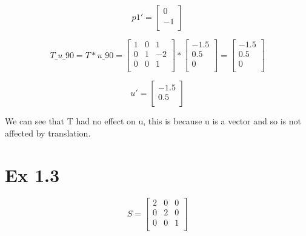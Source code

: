 \documentclass{article}
\begin{document}
\[
    p1' =
    \begin{bmatrix}
        0  \\
        -1 \\
    \end{bmatrix}
\]



\[
    T\_u\_90 = T * u\_90 =
    \begin{bmatrix}
        1 & 0 & 1  \\
        0 & 1 & -2 \\
        0 & 0 & 1  \\
    \end{bmatrix}
    *
    \begin{bmatrix}
        -1.5 \\
        0.5  \\
        0    \\
    \end{bmatrix}
    =
    \begin{bmatrix}
        -1.5 \\
        0.5  \\
        0    \\
    \end{bmatrix}
\]


\[
    u' =
    \begin{bmatrix}
        -1.5 \\
        0.5  \\
    \end{bmatrix}
\]



We can see that T had no effect on u, this is because u is a vector and so is not affected by translation.

\section*{Ex 1.3}

\[
    S =
    \begin{bmatrix}
        2 & 0 & 0 \\
        0 & 2 & 0 \\
        0 & 0 & 1 \\
    \end{bmatrix}
\]
\end{document}
